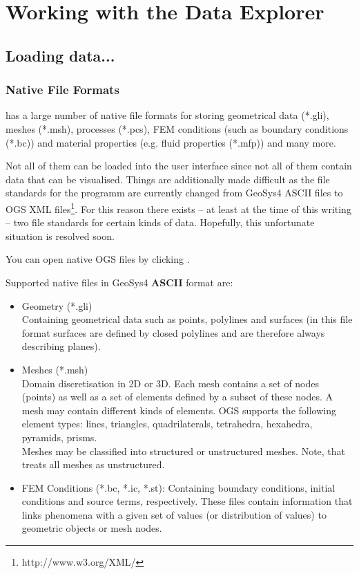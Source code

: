 \chapter{Working with the Data Explorer}

\section{Loading data...}

\subsection{Native File Formats}
\label{nativefileformats}

\ogs has a large number of native file formats for storing geometrical data (*.gli), meshes (*.msh), processes (*.pcs), FEM conditions (such as boundary conditions (*.bc)) and material properties (e.g. fluid properties (*.mfp)) and many more.

Not all of them can be loaded into the user interface since not all of them contain data that can be visualised. Things are additionally made difficult as the file standards for the programm are currently changed from GeoSys4 ASCII files to OGS XML files\footnote{http://www.w3.org/XML/}. For this reason there exists -- at least at the time of this writing -- two file standards for certain kinds of data. Hopefully, this unfortunate situation is resolved soon.

You can open native OGS files by clicking .

Supported native files in GeoSys4 \textbf{ASCII} format are:
\begin{itemize}
\item Geometry (*.gli)\\
    Containing geometrical data such as points, polylines and surfaces (in this file format surfaces are defined by closed polylines and are therefore always describing planes).
\item Meshes (*.msh)\\
    Domain discretisation in 2D or 3D. Each mesh contains a set of nodes (points) as well as a set of elements defined by a subset of these nodes. A mesh may contain different kinds of elements. OGS supports the following element types: lines, triangles, quadrilaterals, tetrahedra, hexahedra, pyramids, prisms.\\
    Meshes may be classified into structured or unstructured meshes. Note, that \ogs treats all meshes as unstructured.
\item FEM Conditions (*.bc, *.ic, *.st): Containing boundary conditions, initial conditions and source terms, respectively. These files contain information that links phenomena with a given set of values (or distribution of values) to geometric objects or mesh nodes.
\end{itemize}

